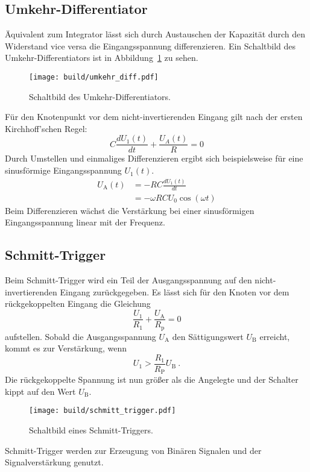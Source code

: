 \subsection{Umkehr-Differentiator}%
\label{sub:umkehr_differentiator}
Äquivalent zum Integrator lässt sich durch Austauschen der Kapazität durch
den Widerstand vice versa die Eingangsspannung differenzieren.
Ein Schaltbild des Umkehr-Differentiators ist in Abbildung~\ref{fig:diff} zu
sehen.
\begin{figure}[h]
		\centering
		\texttt{[image: build/umkehr\_diff.pdf]}
		\caption{Schaltbild des Umkehr-Differentiators.\cite{anleitung}}
		\label{fig:diff}
\end{figure}
Für den Knotenpunkt vor dem nicht-invertierenden Eingang gilt nach der ersten
Kirchhoff'schen Regel:
\begin{equation}
		C \frac{d U_1(t)}{dt} + \frac{U_A(t)}{R} = 0
\end{equation}
Durch Umstellen und einmaliges Differenzieren ergibt sich beispielsweise für
eine sinusförmige Eingangsspannung $U_1(t)$.
\begin{align}
		U_\text{A}(t) &= - RC \frac{dU_1(t)}{dt} \\
                  &= - \omega R C U_0 \cos(\omega t) \label{eq:differentiator}
\end{align}
Beim Differenzieren wächst die Verstärkung bei einer sinusförmigen
Eingangsspannung linear mit der Frequenz.

\subsection{Schmitt-Trigger}%
\label{sub:schmitt_trigger}

Beim Schmitt-Trigger wird ein Teil der Ausgangsspannung auf den
nicht-invertierenden Eingang zurückgegeben.
Es lässt sich für den Knoten vor dem rückgekoppelten Eingang die Gleichung
\begin{equation}
		\frac{U_1}{R_1} + \frac{U_\text{A}}{R_\text{p}} = 0
\end{equation}
aufstellen.
Sobald die Ausgangsspannung $U_\text{A}$ den Sättigungswert $U_\text{B}$ erreicht,
kommt es zur Verstärkung, wenn
\begin{equation}
		\label{eq:schmitt}
		U_1 > \frac{R_1}{R_\text{P}} U_\text{B} \ .
\end{equation}
Die rückgekoppelte Spannung ist nun größer als die Angelegte und der Schalter
kippt auf den Wert $U_\text{B}$.
\begin{figure}[h]
		\centering
		\texttt{[image: build/schmitt\_trigger.pdf]}
		\caption{Schaltbild eines Schmitt-Triggers. \cite{anleitung}}
		\label{fig:}
\end{figure}
Schmitt-Trigger werden zur Erzeugung von Binären Signalen und der
Signalverstärkung genutzt.

